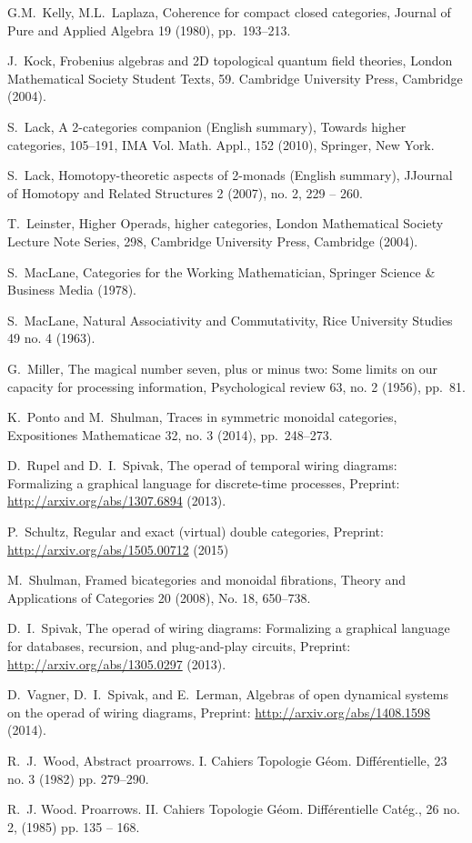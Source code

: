 \documentclass[11pt,oneside,article]{memoir}
\begin{document}
\begin{thebibliography}{XXX}
 G.M.~Kelly, M.L.~Laplaza, Coherence for compact closed categories, Journal of Pure and Applied Algebra 19 (1980), pp.~193--213.

 J.~Kock, Frobenius algebras and 2D topological quantum field theories, London Mathematical Society Student Texts, 59. Cambridge University Press, Cambridge (2004).

 S.~Lack, A 2-categories companion (English summary), Towards higher categories, 105--191, IMA Vol. Math. Appl., 152  (2010), Springer, New York.

 S.~Lack, Homotopy-theoretic aspects of 2-monads (English summary), JJournal of Homotopy and Related Structures 2 (2007), no. 2, 229 -- 260.

 T.~Leinster, Higher Operads, higher categories, London Mathematical Society Lecture Note Series, 298, Cambridge University Press, Cambridge (2004).

 S.~MacLane, Categories for the Working Mathematician, Springer Science \& Business Media (1978).

S.~MacLane, Natural Associativity and Commutativity, Rice University Studies 49 no. 4 (1963).

 G.~Miller, The magical number seven, plus or minus two: Some limits on our capacity for processing information, Psychological review 63, no. 2 (1956), pp.~81.

 K.~Ponto and M.~Shulman, Traces in symmetric monoidal categories, Expositiones Mathematicae 32, no. 3 (2014), pp.~248--273.

 D.~Rupel and D.~I.~Spivak, The operad of temporal wiring diagrams: Formalizing a graphical language for discrete-time processes, Preprint: \url{http://arxiv.org/abs/1307.6894} (2013).

 P.~Schultz, Regular and exact (virtual) double categories, Preprint: \url{http://arxiv.org/abs/1505.00712} (2015)

 M.~Shulman, Framed bicategories and monoidal fibrations, Theory and Applications of Categories 20 (2008), No. 18, 650--738.

 D.~I.~Spivak, The operad of wiring diagrams: Formalizing a graphical language for databases, recursion, and plug-and-play circuits, Preprint: \url{http://arxiv.org/abs/1305.0297} (2013).

 D.~Vagner, D.~I.~Spivak, and E.~Lerman, Algebras of open dynamical systems on the operad of wiring diagrams, Preprint: \url{http://arxiv.org/abs/1408.1598} (2014).

 R.~J.~Wood, Abstract proarrows. I. Cahiers Topologie G\'{e}om. Diff\'{e}rentielle, 23 no. 3 (1982) pp. 279--290.

 R.~J. Wood. Proarrows. II. Cahiers Topologie G\'{e}om. Diff\'{e}rentielle Cat\'{e}g., 26 no. 2, (1985) pp. 135 -- 168.

\end{thebibliography}
\end{document}
